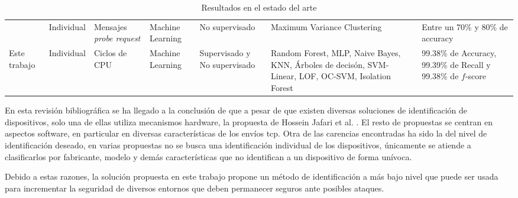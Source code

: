 \begin{table}[htpb!]
{\begin{tabular}{C{0.12\textwidth}C{0.15\textwidth}C{0.15\textwidth}C{0.15\textwidth}C{0.14\textwidth}C{0.2\textwidth}C{0.24\textwidth}}
            \cite{desmond2008identifying} & Individual & Mensajes \textit{probe request} & Machine Learning & No supervisado & Maximum Variance Clustering & Entre un 70\% y 80\% de accuracy\\
            \addlinespace\addlinespace
            Este trabajo & Individual & Ciclos de CPU & Machine Learning & Supervisado y No supervisado & Random Forest, MLP, Naive Bayes, KNN, Árboles de decisón, SVM-Linear, LOF, OC-SVM, Isolation Forest & 99.38\% de Accuracy, 99.39\% de Recall y 99.38\% de $f$-score\\
            \bottomrule
        \end{tabular}
    }
    \caption{Resultados en el estado del arte}
    \label{tab:art_results}
\end{table}

En esta revisión bibliográfica se ha llegado a la conclusión de que a pesar de que existen diversas soluciones de identificación de dispositivos, solo una de ellas utiliza mecanismos hardware, la propuesta de Hossein Jafari et al. \cite{jafari2018iot}. El resto de propuestas se centran en aspectos software, en particular en diversas características de los envíos \acrshort{tcp}. Otra de las carencias encontradas ha sido la del nivel de identificación deseado, en varias propuestas no se busca una identificación individual de los dispositivos, únicamente se atiende a clasificarlos por fabricante, modelo y demás características que no identifican a un dispositivo de forma unívoca.

Debido a estas razones, la solución propuesta en este trabajo propone un método de identificación a más bajo nivel que puede ser usada para incrementar la seguridad de diversos entornos que deben permanecer seguros ante posibles ataques.

